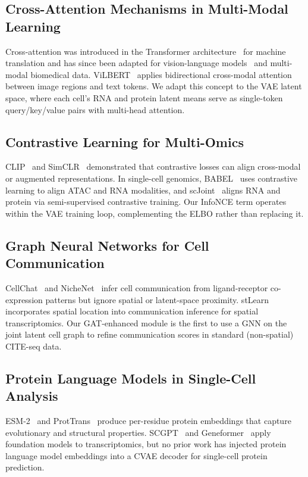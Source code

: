 \documentclass[11pt,a4paper]{article}
\begin{document}
\subsection{Cross-Attention Mechanisms in Multi-Modal Learning}

Cross-attention was introduced in the Transformer architecture~\citep{vaswani2017} for machine translation and has since been adapted for vision-language models~\citep{lu2019,radford2021} and multi-modal biomedical data.
ViLBERT~\citep{lu2019} applies bidirectional cross-modal attention between image regions and text tokens.
We adapt this concept to the VAE latent space, where each cell's RNA and protein latent means serve as single-token query/key/value pairs with multi-head attention.

\subsection{Contrastive Learning for Multi-Omics}

CLIP~\citep{radford2021} and SimCLR~\citep{chen2020} demonstrated that contrastive losses can align cross-modal or augmented representations.
In single-cell genomics, BABEL~\citep{wu2021babel} uses contrastive learning to align ATAC and RNA modalities, and scJoint~\citep{lin2022} aligns RNA and protein via semi-supervised contrastive training.
Our InfoNCE term operates within the VAE training loop, complementing the ELBO rather than replacing it.

\subsection{Graph Neural Networks for Cell Communication}

CellChat~\citep{jin2021} and NicheNet~\citep{nichenet2020} infer cell communication from ligand-receptor co-expression patterns but ignore spatial or latent-space proximity.
stLearn~\citep{pham2020} incorporates spatial location into communication inference for spatial transcriptomics.
Our GAT-enhanced module is the first to use a GNN on the joint latent cell graph to refine communication scores in standard (non-spatial) CITE-seq data.

\subsection{Protein Language Models in Single-Cell Analysis}

ESM-2~\citep{esm2022} and ProtTrans~\citep{elnaggar2022} produce per-residue protein embeddings that capture evolutionary and structural properties.
SCGPT~\citep{cui2024} and Geneformer~\citep{theodoris2023} apply foundation models to transcriptomics, but no prior work has injected protein language model embeddings into a CVAE decoder for single-cell protein prediction.
\end{document}
